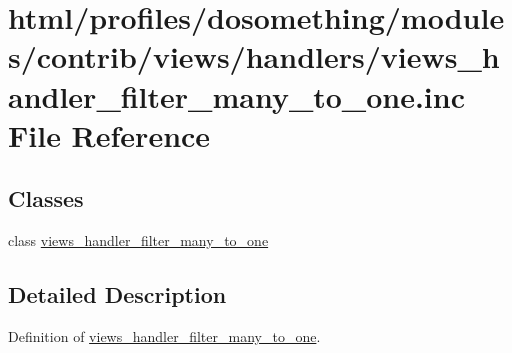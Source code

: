 \hypertarget{views__handler__filter__many__to__one_8inc}{
\section{html/profiles/dosomething/modules/contrib/views/handlers/views\_\-handler\_\-filter\_\-many\_\-to\_\-one.inc File Reference}
\label{views__handler__filter__many__to__one_8inc}
}
\subsection*{Classes}
\begin{DoxyCompactItemize}
\item 
class \hyperlink{classviews__handler__filter__many__to__one}{views\_\-handler\_\-filter\_\-many\_\-to\_\-one}
\end{DoxyCompactItemize}


\subsection{Detailed Description}
Definition of \hyperlink{classviews__handler__filter__many__to__one}{views\_\-handler\_\-filter\_\-many\_\-to\_\-one}. 